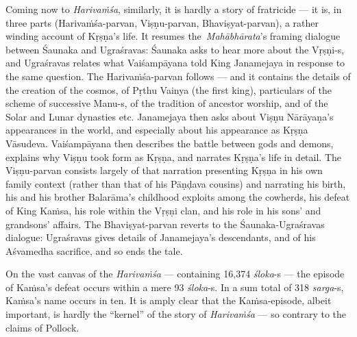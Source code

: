 Coming now to {\sl Harivaṁśa}, similarly, it is hardly a story of fratricide --- it is, in three parts (Harivaṁśa-parvan, Viṣṇu-parvan, Bhaviṣyat-parvan), a rather winding account of Kṛṣṇa’s life. It resumes the {\sl Mahābhārata}’s framing dialogue between Śaunaka and Ugraśravas: Śaunaka asks to hear more about the Vṛṣṇi-s, and Ugraśravas relates what Vaiśampāyana told King Janamejaya in response to the same question. The Harivaṁśa-parvan follows --- and it contains the details of the creation of the cosmos, of Pṛthu Vainya (the first king), particulars of the scheme of successive Manu-s, of the tradition of ancestor worship, and of the Solar and Lunar dynasties etc. Janamejaya then asks about Viṣṇu Nārāyaṇa’s appearances in the world, and especially about his appearance as Kṛṣṇa Vāsudeva. Vaiśampāyana then describes the battle between gods and demons, explains why Viṣṇu took form as Kṛṣṇa, and narrates Kṛṣṇa’s life in detail. The Viṣṇu-parvan consists largely of that narration presenting Kṛṣṇa in his own family context (rather than that of his Pāṇḍava cousins) and narrating his birth, his and his brother Balarāma’s childhood exploits among the cowherds, his defeat of King Kaṁsa, his role within the Vṛṣṇi clan, and his role in his sons’ and grandsons’ affairs. The Bhaviṣyat-parvan reverts to the Śaunaka-Ugraśravas dialogue: Ugraśravas gives details of Janamejaya’s descendants, and of his Aśvamedha sacrifice, and so ends the tale.
\vskip 1.3pt

On the vast canvas of the {\sl Harivaṁśa} --- containing 16,374 {\sl śloka}-s --- the episode of Kaṁsa’s defeat occurs within a mere 93 {\sl śloka}-s. In a sum total of 318 {\sl sarga}-s, Kaṁsa’s name occurs in ten. It is amply clear that the Kaṁsa-episode, albeit important, is hardly the “kernel” of the story of {\sl Harivaṁśa} --- so contrary to the claims of Pollock. 
\vskip 1.3pt

